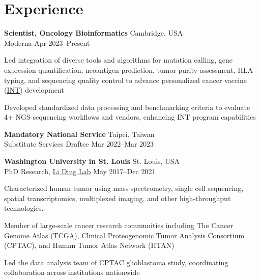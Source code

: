\section{Experience}
\begin{entrylist}

\item \textbf{Scientist, Oncology Bioinformatics} \hfill Cambridge, USA\\
Moderna \hfill
Apr 2023--Present
\begin{detaillist}
    \item Led integration of diverse tools and algorithms for mutation calling, gene expression quantification, neoantigen prediction, tumor purity assessment, HLA typing, and sequencing quality control to advance personalized cancer vaccine (\href{https://en.wikipedia.org/wiki/MRNA-4157/V940}{INT}) development
    \item Developed standardized data processing and benchmarking criteria to evaluate 4+ NGS sequencing workflows and vendors, enhancing INT program capabilities
\end{detaillist}

\item \textbf{Mandatory National Service} \hfill Taipei, Taiwan\\
Substitute Services Draftee \hfill
Mar 2022--Mar 2023

\item \textbf{Washington University in St. Louis} \hfill St. Louis, USA\\
PhD Research, \href{https://dinglab.wustl.edu/}{Li Ding Lab} \hfill
May 2017--Dec 2021
\begin{detaillist}
    \item Characterized human tumor using mass spectrometry, single cell sequencing, spatial transcriptomics, multiplexed imaging, and other high-throughput technologies.
    \item Member of large-scale cancer research communities including The Cancer Genome Atlas (TCGA), Clinical Proteogenomic Tumor Analysis Consortium (CPTAC), and Human Tumor Atlas Network (HTAN)
    \item Led the data analysis team of CPTAC glioblastoma study, coordinating collaboration across institutions nationwide
\end{detaillist}


\end{entrylist}
